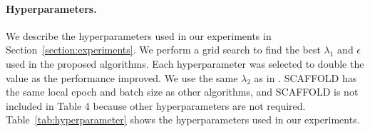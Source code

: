 \documentclass{article} %
\begin{document}
\paragraph{Hyperparameters.}
We describe the hyperparameters used in our experiments in Section~\ref{section:experiments}. We perform a grid search to find the best $\lambda_{1}$ and $\epsilon$ used in the proposed algorithms. Each hyperparameter was selected to double the value as the performance improved. We use the same $\lambda_{2}$ as in \citet{Acar2021federated}. SCAFFOLD has the same local epoch and batch size as other algorithms, and SCAFFOLD is not included in Table 4 because other hyperparameters are not required. Table~\ref{tab:hyperparameter} shows the hyperparameters used in our experiments.

\end{document}
